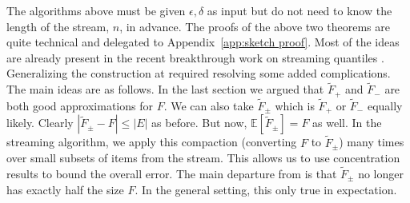 \documentclass[anon,12pt]{colt2019} %
\newcommand{\E}{\mathbb{E}}
\newcommand{\eps}{\epsilon}
\begin{document}
The algorithms above must be given $\eps, \delta$ as input but do not need to know the length of the stream, $n$, in advance. 
The proofs of the above two theorems are quite technical and delegated to Appendix~\ref{app:sketch proof}. Most of the ideas are already present in the recent breakthrough work on streaming quantiles \cite{DBLP:conf/focs/KarninLL16}. Generalizing the construction at  \cite{DBLP:conf/focs/KarninLL16} required resolving some added complications. The main ideas are as follows. 
In the last section we argued that $\tilde F_{+}$ and $\tilde F_{-}$ are both good approximations for $F$. 
We can also take $\tilde F_{\pm}$ which is $\tilde F_{+}$ or $\tilde F_{-}$ equally likely. 
Clearly $|\tilde F_{\pm} - F| \le |E|$ as before. But now, $\E[\tilde F_{\pm}] = F$ as well. 
In the streaming algorithm, we apply this compaction (converting $F$ to $\tilde F_{\pm}$) many times over small subsets of items from the stream. This allows us to use concentration results to bound the overall error. The main departure from \cite{DBLP:conf/focs/KarninLL16} is that $\tilde F_{\pm}$ no longer has exactly half the size $F$. In the general setting, this only true in expectation.
\end{document}
